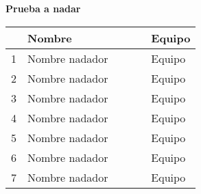\begin{minipage}{0.95\linewidth}
    \begin{flushleft}
        \textbf{
            Prueba a nadar
        }
    \end{flushleft}
    \begin{tabular}{cp{0.65\linewidth}l}
        \hline
          & \textbf{Nombre}        & \textbf{Equipo} \\ \hline
        1 & Nombre nadador & Equipo          \\
        2 & Nombre nadador         & Equipo          \\
        3 & Nombre nadador         & Equipo          \\
        4 & Nombre nadador         & Equipo          \\
        5 & Nombre nadador         & Equipo          \\
        6 & Nombre nadador         & Equipo          \\
        7 & Nombre nadador         & Equipo          \\
    \end{tabular}
\end{minipage}
\vspace{0.5cm}